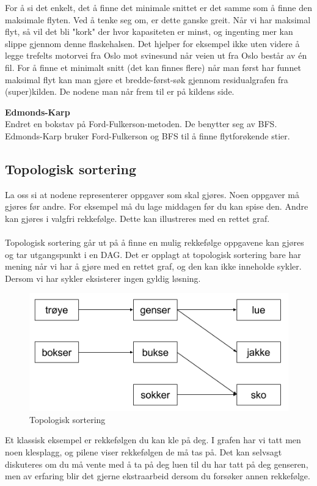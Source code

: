 \noindent For å si det enkelt, det å finne det minimale snittet er det samme som å finne den maksimale flyten. Ved å tenke seg om, er dette ganske greit. Når vi har maksimal flyt, så vil det bli "kork" der hvor kapasiteten er minst, og ingenting mer kan slippe gjennom denne flaskehalsen. Det hjelper for eksempel ikke uten videre å legge trefelts motorvei fra Oslo mot svinesund når veien ut fra Oslo består av én fil. For å finne et minimalt snitt (det kan finnes flere) når man først har funnet maksimal flyt kan man gjøre et bredde-først-søk gjennom residualgrafen fra (super)kilden. De nodene man når frem til er på kildens side.

\noindent \textbf{Edmonds-Karp}\\
Endret en bokstav på Ford-Fulkerson-metoden. De benytter seg av BFS. Edmonds-Karp bruker Ford-Fulkerson og BFS til å finne flytforøkende stier.\\

\subsection{Topologisk sortering}
La oss si at nodene representerer oppgaver som skal gjøres. Noen oppgaver må gjøres før andre. For eksempel må du lage middagen før du kan spise den. Andre kan gjøres i valgfri rekkefølge. Dette kan illustreres med en rettet graf.
\\\\
Topologisk sortering går ut på å finne en mulig rekkefølge oppgavene kan gjøres og tar utgangspunkt i en DAG. Det er opplagt at topologisk sortering bare har mening når vi har å gjøre med en rettet graf, og den kan ikke inneholde sykler. Dersom vi har sykler eksisterer ingen gyldig løsning.

\begin{boxed}
\begin{figure}[H]
\includegraphics[scale=0.7]{images/topologisk}
\centering %
\caption{Topologisk sortering}
\label{fig:topologisk}
\end{figure}

Et klassisk eksempel er rekkefølgen du kan kle på deg. I grafen har vi tatt men noen klesplagg, og pilene viser rekkefølgen de må tas på. Det kan selvsagt diskuteres om du må vente med å ta på deg luen til du har tatt på deg genseren, men av erfaring blir det gjerne ekstraarbeid dersom du forsøker annen rekkefølge.
\end{boxed}

